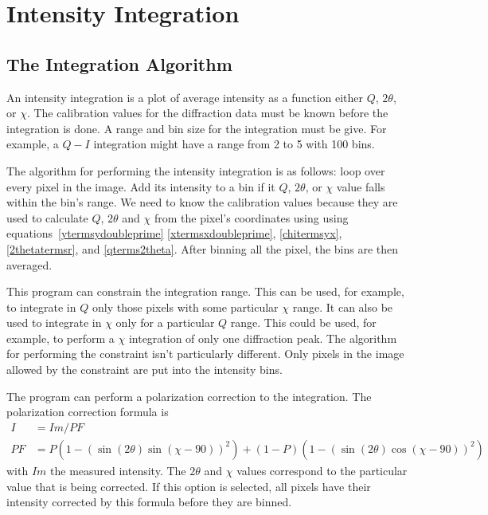\chapter{Intensity Integration}

\section{The Integration Algorithm}\label{integration_algorithm}

An intensity integration is a plot of average intensity as 
a function either $Q$, $2\theta$, or $\chi$. The calibration 
values for the diffraction data must be known before 
the integration is done. A range and bin size for the
integration must be give. For example, a $Q-I$ integration 
might have a range from 2 to 5 with 100 bins. 

The algorithm for performing the intensity integration
is as follows: loop over every pixel in the image. 
Add its intensity to a bin if it $Q$, $2\theta$, 
or $\chi$ value falls within the bin's range.
We need to know the calibration values because
they are used to calculate $Q$, $2\theta$ and $\chi$
from the pixel's coordinates using 
using equations~\ref{ytermsydoubleprime}
\ref{xtermsxdoubleprime}, \ref{chitermsyx}, 
\ref{2thetatermsr}, and \ref{qterms2theta}.
After binning all the pixel, the bins are then averaged.

This program can constrain the integration range. 
This can be used, for example, to integrate
in $Q$ only those pixels with some particular 
$\chi$ range. It can also be used to integrate
in $\chi$ only for a particular
$Q$ range. This could be used, for example, to
perform a $\chi$ integration of only one
diffraction peak. The algorithm for performing
the constraint isn't particularly different. Only
pixels in the image allowed by the constraint
are put into the intensity bins.

The program can perform a polarization 
correction to the integration. The polarization 
correction formula is
\begin{align}
    I&=Im/PF \\ 
    PF&=P(1 - (\sin(2\theta)\sin(\chi-90))^2) + 
    (1 - P)(1 - (\sin(2\theta)\cos(\chi-90))^2)
\end{align}
with $Im$ the measured intensity.  The $2\theta$ 
and $\chi$ values correspond to the particular 
value that is being corrected. If this option
is selected, all pixels have their intensity
corrected by this formula before they
are binned. 

